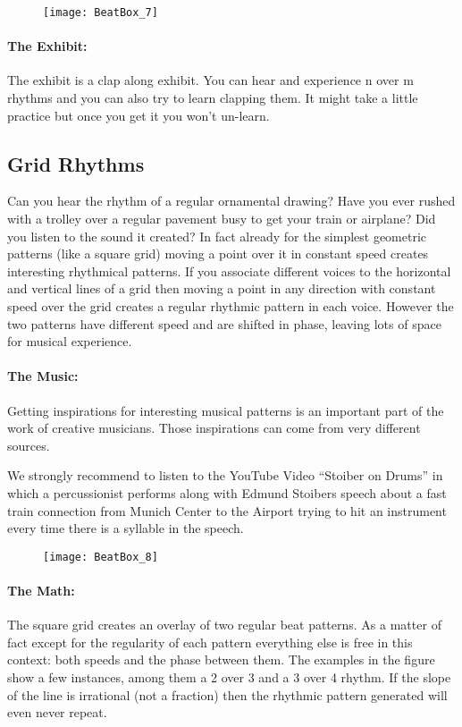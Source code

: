\begin{figure}[h]
\centering
\texttt{[image: BeatBox\_7]}
\end{figure}

\paragraph{The Exhibit:} The exhibit is a clap along exhibit. You can hear and experience n over m rhythms and you can also try to learn clapping them. It might take a little practice but once you get it you won't un-learn.


\subsection{Grid Rhythms}
Can you hear the rhythm of a regular ornamental drawing? Have you ever rushed with a trolley over a regular pavement busy to get your train or airplane? Did you listen to the sound it created? In fact already for the simplest geometric patterns (like a square grid) moving a point over it in constant speed creates interesting rhythmical patterns. If you associate different voices to the horizontal and vertical lines of a grid then moving a point in any direction with constant speed over the grid creates a regular rhythmic pattern in each voice. However the two patterns have different speed and are shifted in phase, leaving lots of space for musical experience.

\paragraph{The Music:} Getting inspirations for interesting musical patterns is an important part of the work of creative musicians. Those inspirations can come from very different sources. 

We strongly recommend to listen to the YouTube Video ``Stoiber on Drums'' in which a percussionist performs along with Edmund Stoibers speech about a fast train connection from Munich Center to the Airport trying to hit an instrument every time there is a syllable in the speech.  

\begin{figure}[h]
\centering
\texttt{[image: BeatBox\_8]}
\end{figure}

\paragraph{The Math:} The square grid creates an overlay of two regular beat patterns. As a matter of fact except for the regularity of each pattern everything else is free in this context: both speeds and the phase between them. The examples in the figure show a few instances, among them a 2 over 3 and a 3 over 4 rhythm. If the slope of the line is irrational (not a fraction) then the rhythmic pattern generated will even never repeat.

